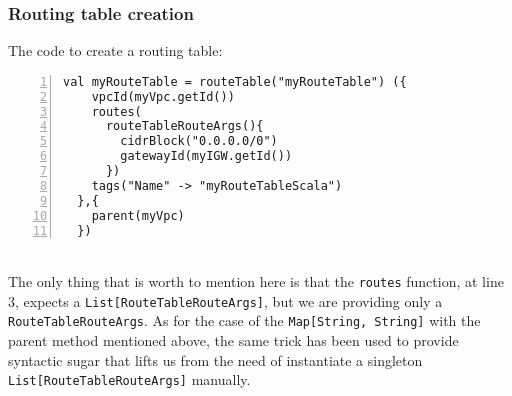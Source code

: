 \subsubsection{Routing table creation}
The code to create a routing table:
\begin{lstlisting}[numbers=left, numberstyle=\tiny, numbersep=-5pt, stepnumber=1]
  val myRouteTable = routeTable("myRouteTable") ({
    vpcId(myVpc.getId())
    routes(
      routeTableRouteArgs(){
        cidrBlock("0.0.0.0/0")
        gatewayId(myIGW.getId())
      })
    tags("Name" -> "myRouteTableScala")
  },{
    parent(myVpc)
  })
\end{lstlisting}\mbox{}\\
The only thing that is worth to mention here is that the \texttt{routes} function, at line 3, expects a \texttt{List[RouteTableRouteArgs]}, but we are providing only a \texttt{RouteTableRouteArgs}.
As for the case of the \texttt{Map[String, String]} with the parent method mentioned above, the same trick has been used to provide syntactic sugar that lifts us from the need of instantiate a singleton \texttt{List[RouteTableRouteArgs]} manually.

